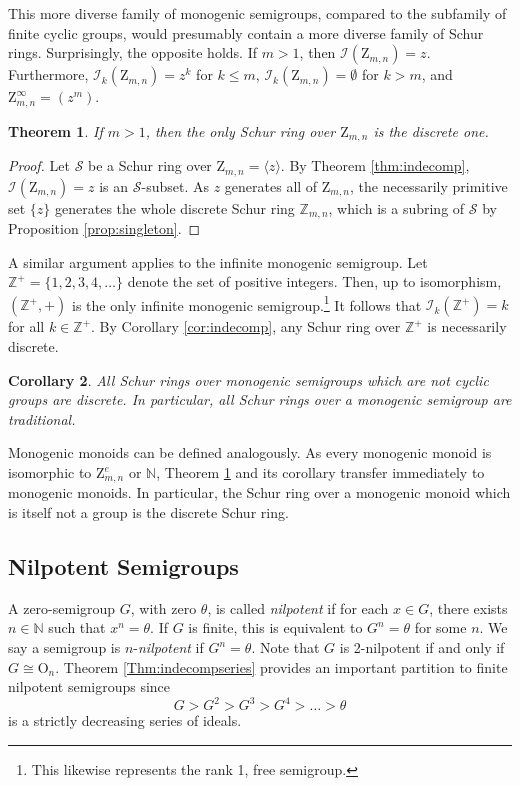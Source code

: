 \documentclass{article}
\theoremstyle{plain}
\newtheorem{Thm}{Theorem}[section]
\newtheorem{Cor}[Thm]{Corollary}
\theoremstyle{definition}
\newcommand{\thmref}[1]{Theorem \ref{#1}}
\newcommand{\corref}[1]{Corollary \ref{#1}}
\newcommand{\propref}[1]{Proposition \ref{#1}}
\renewcommand{\S}{\mathcal{S}}
\newcommand{\Z}{\mathbb{Z}}
\newcommand{\N}{\mathbb{N}}
\newcommand{\I}{\mathscr{I}}
\renewcommand{\O}{\mathrm{O}}
\newcommand{\z}{\mathrm{Z}}
\begin{document}
This more diverse family of monogenic semigroups, compared to the subfamily of finite cyclic groups, would presumably contain a more diverse family of Schur rings. Surprisingly, the opposite holds. If $m>1$, then $\I(\z_{m,n}) = z$. Furthermore, $\I_{k}(\z_{m,n}) = z^{k}$ for $k\leq m$, $\I_k(\z_{m,n})=\emptyset$ for $k > m$, and $\z_{m,n}^\infty = (z^m)$.

\begin{Thm}\label{thm:monogenic} If $m>1$, then the only Schur ring over $\z_{m,n}$ is the discrete one.  
\end{Thm}
\begin{proof}
    Let $\S$ be a Schur ring over $\z_{m,n}=\langle z\rangle$. By \thmref{thm:indecomp}, $\I(\z_{m,n}) = z$ is an $\S$-subset. As $z$ generates all of $\z_{m,n}$, the necessarily primitive set $\{z\}$ generates the whole discrete Schur ring $\Z_{m,n}$, which is a subring of $\S$ by \propref{prop:singleton}.
\end{proof}

A similar argument applies to the infinite monogenic semigroup. Let $\Z^+ = \{1, 2,3,4,\ldots\}$ denote the set of positive integers. Then, up to isomorphism, $(\Z^+,+)$ is the only infinite monogenic semigroup.\footnote{This likewise represents the rank 1, free semigroup.} It follows that $\I_{k}(\Z^+) = k$ for all $k\in \Z^+$. By \corref{cor:indecomp}, any Schur ring over $\Z^+$ is necessarily discrete.

\begin{Cor} All Schur rings over monogenic semigroups which are not cyclic groups are discrete. In particular, all Schur rings over a monogenic semigroup are traditional. \end{Cor}

Monogenic monoids can be defined analogously. As every monogenic monoid is isomorphic to $\z_{m,n}^e$ or $\N$, \thmref{thm:monogenic} and its corollary transfer immediately to monogenic monoids. In particular, the Schur ring over a monogenic monoid which is itself not a group is the discrete Schur ring.

\subsection{Nilpotent Semigroups}
A zero-semigroup $G$, with zero $\theta$, is called \emph{nilpotent} if for each $x\in G$, there exists $n\in\N$ such that $x^n=\theta$. If $G$ is finite, this is equivalent to $G^n=\theta$ for some $n$. We say a semigroup is $n$-\emph{nilpotent} if $G^n=\theta$. Note that $G$ is 2-nilpotent if and only if $G\cong\O_n$. \thmref{Thm:indecompseries} provides an important partition to finite nilpotent semigroups since 
\[G > G^2 > G^3 > G^4 >\ldots > \theta\] is a strictly decreasing series of ideals.
\end{document}
